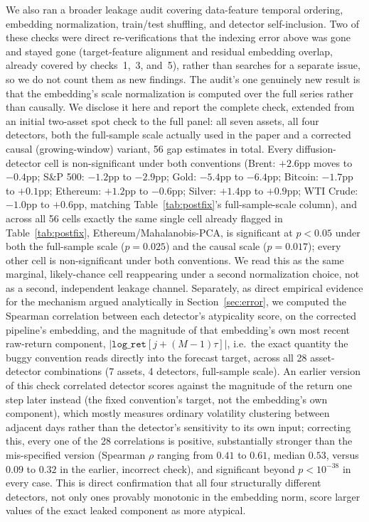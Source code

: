 \documentclass[preprint,12pt]{elsarticle}
\begin{document}
We also ran a broader leakage audit covering data-feature temporal ordering, embedding
normalization, train/test shuffling, and detector self-inclusion. Two of these checks were
direct re-verifications that the indexing error above was gone and stayed gone (target-feature
alignment and residual embedding overlap, already covered by checks~1,~3, and~5), rather than
searches for a separate issue, so we do not count them as new findings. The audit's one
genuinely new result is that the embedding's scale normalization is computed over the full
series rather than causally. We disclose it here and report the complete check, extended from
an initial two-asset spot check to the full panel: all seven assets, all four detectors, both
the full-sample scale actually used in the paper and a corrected causal (growing-window)
variant, 56 gap estimates in total. Every diffusion-detector cell is non-significant under both
conventions (Brent: $+2.6$pp moves to $-0.4$pp; S\&P 500: $-1.2$pp to $-2.9$pp; Gold: $-5.4$pp
to $-6.4$pp; Bitcoin: $-1.7$pp to $+0.1$pp; Ethereum: $+1.2$pp to $-0.6$pp; Silver: $+1.4$pp to
$+0.9$pp; WTI Crude: $-1.0$pp to $+0.6$pp, matching Table~\ref{tab:postfix}'s full-sample-scale
column), and across all 56 cells exactly the same single cell
already flagged in Table~\ref{tab:postfix}, Ethereum/Mahalanobis-PCA, is significant at $p<0.05$
under both the full-sample scale ($p=0.025$) and the causal scale ($p=0.017$); every other cell
is non-significant under both conventions. We read this as the same marginal, likely-chance cell
reappearing under a second normalization choice, not as a second, independent leakage channel.
Separately, as direct empirical evidence for the mechanism argued analytically in
Section~\ref{sec:error}, we computed the Spearman correlation between each detector's
atypicality score, on the corrected pipeline's embedding, and the magnitude of that embedding's
own most recent raw-return component, $|\texttt{log\_ret}[j+(M-1)\tau]|$, i.e.\ the exact
quantity the buggy convention reads directly into the forecast target, across all 28
asset-detector combinations (7 assets, 4 detectors, full-sample scale). An earlier version of
this check correlated detector scores against the magnitude of the return one step later instead
(the fixed convention's target, not the embedding's own component), which mostly measures
ordinary volatility clustering between adjacent days rather than the detector's sensitivity to
its own input; correcting this, every one of the 28 correlations is positive, substantially
stronger than the mis-specified version (Spearman $\rho$ ranging from $0.41$ to $0.61$, median
$0.53$, versus $0.09$ to $0.32$ in the earlier, incorrect check), and significant beyond
$p<10^{-38}$ in every case. This is direct confirmation that all four structurally different
detectors, not only ones provably monotonic in the embedding norm, score larger values of the
exact leaked component as more atypical.
\end{document}
